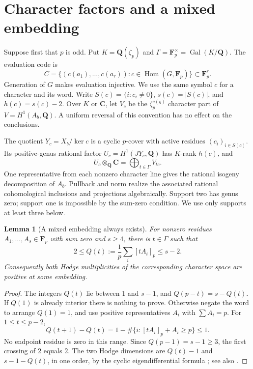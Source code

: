 \documentclass[11pt]{article}
\newtheorem{lemma}[theorem]{Lemma}
\theoremstyle{definition}
\newcommand{\Q}{\mathbf Q}
\newcommand{\C}{\mathbf C}
\newcommand{\F}{\mathbf F}
\newcommand{\Hom}{\operatorname{Hom}}
\newcommand{\Gal}{\operatorname{Gal}}
\begin{document}
\section{Character factors and a mixed embedding}\label{sec:moving}
Suppose first that $p$ is odd. Put $K=\Q(\zeta_p)$ and
$\Gamma=\F_p^\times=\Gal(K/\Q)$. The evaluation code is
\[
 C=\{(c(a_1),\ldots,c(a_r)):c\in\Hom(G,\F_p)\}\subset\F_p^r.
\]
Generation of $G$ makes evaluation injective. We use the same symbol $c$
for a character and its word. Write $S(c)=\{i:c_i\ne0\}$,
$s(c)=|S(c)|$, and $h(c)=s(c)-2$. Over $K$ or $\C$, let $V_c$ be the
$\zeta_p^{c(g)}$ character part of $V=H^1(A_b,\Q)$. A uniform reversal
of this convention has no effect on the conclusions.

The quotient $Y_c=X_b/\ker c$ is a cyclic $p$-cover with active residues
$(c_i)_{i\in S(c)}$. Its positive-genus rational factor
$U_c=H^1(JY_c,\Q)$ has $K$-rank $h(c)$, and
\[
 U_c\otimes_\Q\C=\bigoplus_{t\in\Gamma}V_{tc}.
\]
One representative from each nonzero character line gives the rational
isogeny decomposition of $A_b$. Pullback and norm realize the associated
rational cohomological inclusions and projections algebraically. Support two
has genus zero; support one is impossible by the sum-zero condition. We use
only supports at least three below.

\begin{lemma}[A mixed embedding always exists]\label{lem:mixed}
For nonzero residues $A_1,\ldots,A_s\in\F_p$ with sum zero and $s\geq4$,
there is $t\in\Gamma$ such that
\[
 2\leq Q(t):=\frac1p\sum_i[tA_i]_p\leq s-2.
\]
Consequently both Hodge multiplicities of the corresponding character
space are positive at some embedding.
\end{lemma}
\begin{proof}
The integers $Q(t)$ lie between $1$ and $s-1$, and
$Q(p-t)=s-Q(t)$. If $Q(1)$ is already interior there is nothing to prove.
Otherwise negate the word to arrange $Q(1)=1$, and use positive representatives
$A_i$ with $\sum A_i=p$. For $1\leq t\leq p-2$,
\[
 Q(t+1)-Q(t)=1-\#\{i:[tA_i]_p+A_i\geq p\}\leq1.
\]
No endpoint residue is zero in this range. Since $Q(p-1)=s-1\geq3$,
the first crossing of $2$ equals $2$. The two Hodge dimensions are
$Q(t)-1$ and $s-1-Q(t)$, in one order, by the cyclic eigendifferential
formula \cite[Theorem~2.1]{MN}; see also \cite[Section~6]{Fusion}.
\end{proof}
\end{document}
